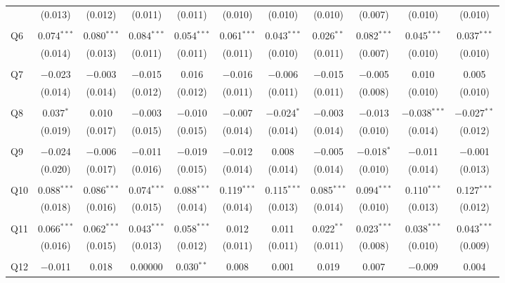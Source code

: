 \documentclass[11pt,a4paper]{report}
\begin{document}
\begin{table}
\begin{tabular}{@{\extracolsep{8pt}}lcccccccccc}
	& (0.013) & (0.012) & (0.011) & (0.011) & (0.010) & (0.010) & (0.010) & (0.007) & (0.010) & (0.010) \\ 
	& & & & & & & & & & \\ 
	Q6 & 0.074$^{***}$ & 0.080$^{***}$ & 0.084$^{***}$ & 0.054$^{***}$ & 0.061$^{***}$ & 0.043$^{***}$ & 0.026$^{**}$ & 0.082$^{***}$ & 0.045$^{***}$ & 0.037$^{***}$ \\ 
	& (0.014) & (0.013) & (0.011) & (0.011) & (0.011) & (0.010) & (0.011) & (0.007) & (0.010) & (0.010) \\ 
	& & & & & & & & & & \\ 
	Q7 & $-$0.023 & $-$0.003 & $-$0.015 & 0.016 & $-$0.016 & $-$0.006 & $-$0.015 & $-$0.005 & 0.010 & 0.005 \\ 
	& (0.014) & (0.014) & (0.012) & (0.012) & (0.011) & (0.011) & (0.011) & (0.008) & (0.010) & (0.010) \\ 
	& & & & & & & & & & \\ 
	Q8 & 0.037$^{*}$ & 0.010 & $-$0.003 & $-$0.010 & $-$0.007 & $-$0.024$^{*}$ & $-$0.003 & $-$0.013 & $-$0.038$^{***}$ & $-$0.027$^{**}$ \\ 
	& (0.019) & (0.017) & (0.015) & (0.015) & (0.014) & (0.014) & (0.014) & (0.010) & (0.014) & (0.012) \\ 
	& & & & & & & & & & \\ 
	Q9 & $-$0.024 & $-$0.006 & $-$0.011 & $-$0.019 & $-$0.012 & 0.008 & $-$0.005 & $-$0.018$^{*}$ & $-$0.011 & $-$0.001 \\ 
	& (0.020) & (0.017) & (0.016) & (0.015) & (0.014) & (0.014) & (0.014) & (0.010) & (0.014) & (0.013) \\ 
	& & & & & & & & & & \\ 
	Q10 & 0.088$^{***}$ & 0.086$^{***}$ & 0.074$^{***}$ & 0.088$^{***}$ & 0.119$^{***}$ & 0.115$^{***}$ & 0.085$^{***}$ & 0.094$^{***}$ & 0.110$^{***}$ & 0.127$^{***}$ \\ 
	& (0.018) & (0.016) & (0.015) & (0.014) & (0.014) & (0.013) & (0.014) & (0.010) & (0.013) & (0.012) \\ 
	& & & & & & & & & & \\ 
	Q11 & 0.066$^{***}$ & 0.062$^{***}$ & 0.043$^{***}$ & 0.058$^{***}$ & 0.012 & 0.011 & 0.022$^{**}$ & 0.023$^{***}$ & 0.038$^{***}$ & 0.043$^{***}$ \\ 
	& (0.016) & (0.015) & (0.013) & (0.012) & (0.011) & (0.011) & (0.011) & (0.008) & (0.010) & (0.009) \\ 
	& & & & & & & & & & \\ 
	Q12 & $-$0.011 & 0.018 & 0.00000 & 0.030$^{**}$ & 0.008 & 0.001 & 0.019 & 0.007 & $-$0.009 & 0.004 \\ 

\end{tabular}
\end{table}
\end{document}
